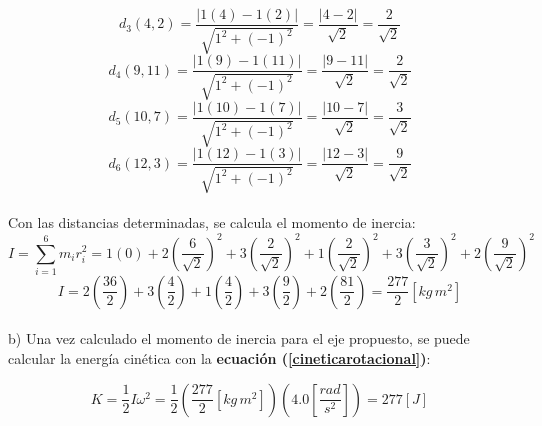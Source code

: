 \documentclass[letter,oneside,11pt]{article}
\begin{document}
\begin{minipage}[b]{.9\linewidth}
\begin{equation*}
    d_3(4,2) = \frac{| 1 (4) - 1 (2) |}{\sqrt{1^2 + (-1)^2}} = \frac{|4 - 2|}{\sqrt{2}} = \frac{2}{\sqrt{2}}
\end{equation*}
\begin{equation*}
    d_4(9,11) = \frac{| 1 (9) - 1 (11) |}{\sqrt{1^2 + (-1)^2}} = \frac{|9 - 11|}{\sqrt{2}} = \frac{2}{\sqrt{2}}
\end{equation*}
\begin{equation*}
    d_5(10,7) = \frac{| 1 (10) - 1 (7) |}{\sqrt{1^2 + (-1)^2}} = \frac{|10 - 7|}{\sqrt{2}} = \frac{3}{\sqrt{2}}
\end{equation*}
\begin{equation*}
    d_6(12,3) = \frac{| 1 (12) - 1 (3) |}{\sqrt{1^2 + (-1)^2}} = \frac{|12 - 3|}{\sqrt{2}} = \frac{9}{\sqrt{2}}
\end{equation*}
\\

Con las distancias determinadas, se calcula el momento de inercia:
\begin{equation*}
    I = \sum_{i=1}^{6} m_i r^2_i = 1 (0) + 2\left(\frac{6}{\sqrt{2}}\right)^2 + 3\left(\frac{2}{\sqrt{2}}\right)^2 + 1\left(\frac{2}{\sqrt{2}}\right)^2 + 3\left(\frac{3}{\sqrt{2}}\right)^2 + 2\left(\frac{9}{\sqrt{2}}\right)^2
\end{equation*}
\begin{equation*}
    I = 2 \left(\frac{36}{2}\right) + 3 \left(\frac{4}{2}\right) + 1 \left(\frac{4}{2}\right) + 3 \left(\frac{9}{2}\right) + 2 \left(\frac{81}{2}\right) = \frac{277}{2} [kg\, m^2]
\end{equation*}
\\

b) Una vez calculado el momento de inercia para el eje propuesto, se puede
calcular la energía cinética con la \textbf{ecuación
(\ref{cineticarotacional})}:

\begin{equation*}
    K = \frac{1}{2} I \omega^2 =  \frac{1}{2} \left(\frac{277}{2} [kg\, m^2]\right) \left(4.0 \left[\frac{rad}{s^2}\right]\right) = 277 [J]
\end{equation*}
\end{minipage}
\end{document}
